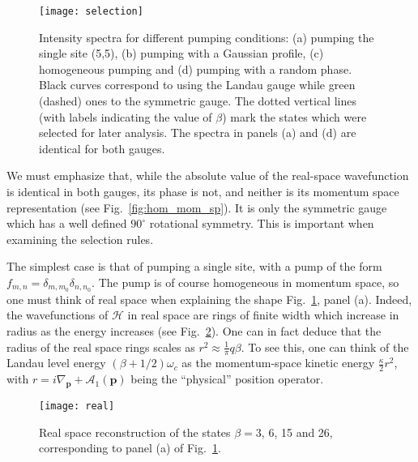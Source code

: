 \documentclass[twocolumn, 10pt, aps, superscriptaddress, floatfix, showpacs, pra, citeautoscript]{revtex4-1}
\newcommand{\co}[2]{#2}
\renewcommand{\paragraph}{\co}
\begin{document}
\begin{figure}[htb]\centering
  \texttt{[image: selection]} %
  \caption{Intensity spectra for different pumping conditions: (a)
    pumping the single site (5,5), (b) pumping with a Gaussian
    profile, (c) homogeneous pumping and (d) pumping with a random
    phase. Black curves correspond to using the Landau gauge while
    green (dashed) ones to the symmetric gauge. The dotted vertical
    lines (with labels indicating the value of $\beta$) mark the
    states which were selected for later analysis. The spectra in
    panels (a) and (d) are identical for both gauges.}
  \label{fig:pumping_schemes}
\end{figure}

We must emphasize that, while the absolute value of the real-space
wavefunction is identical in both gauges, its phase is not, and
neither is its momentum space representation (see
Fig.~\ref{fig:hom_mom_sp}). It is only the symmetric gauge which has a
well defined $90^{\circ}$ rotational symmetry. This is important when
examining the selection rules.

\paragraph{A δ pump in real space is homogeneous in momentum space.}
The simplest case is that of pumping a single site, with a pump of the
form $f_{m,n} = \delta_{m,m_0} \delta_{n,n_0}$. The pump is of course
homogeneous in momentum space, so one must think of real space when
explaining the shape Fig.~\ref{fig:pumping_schemes}, panel (a).
Indeed, the wavefunctions of $\mathcal{H}$ in real space are rings of finite
width which increase in radius as the energy increases (see
Fig.~\ref{fig:delta_real_sp}). One can in fact deduce that the radius
of the real space rings scales as $r^2 \approx \frac{1}{\pi} q
\beta$.
To see this, one can think of the Landau level energy
$(\beta + 1/2)\omega_c$ as the momentum-space kinetic energy
$\frac{\kappa}{2}r^2$, with
$r = i\nabla_{\mathbf{p}} + \mathcal{A}_1(\mathbf{p})$ being the
``physical'' position operator.
\begin{figure}[htb]
  \centering
  \texttt{[image: real]} %
  \caption{Real space reconstruction of the states $\beta=3$, 6, 15
    and 26, corresponding to panel (a) of
    Fig.~\ref{fig:pumping_schemes}.}
  \label{fig:delta_real_sp}
\end{figure}
\end{document}
